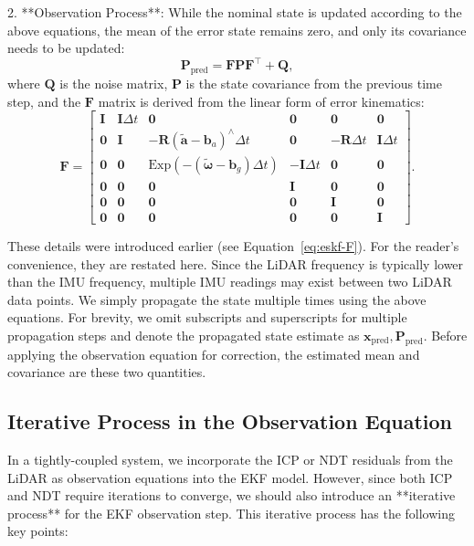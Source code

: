 2. **Observation Process**: While the nominal state is updated according to the above equations, the mean of the error state remains zero, and only its covariance needs to be updated:  
\begin{equation}\label{key}  
	\bm{P}_{\text{pred}} = \bm{F} \bm{P} \bm{F}^\top + \bm{Q},  
\end{equation}  
where $\bm{Q}$ is the noise matrix, $\bm{P}$ is the state covariance from the previous time step, and the $\bm{F}$ matrix is derived from the linear form of error kinematics:  
\begin{equation}  
	\bm{F} = \begin{bmatrix}  
		\bm{I} & \bm{I} \Delta t & \bm{0} & \bm{0} & \bm{0} & \bm{0} \\  
		\bm{0} & \bm{I} & - \bm{R}(\tilde{\bm{a}} - \bm{b}_a)^\wedge \Delta t & \bm{0} & -\bm{R} \Delta t & \bm{I} \Delta t \\  
		\bm{0} & \bm{0} & \mathrm{Exp}\left( -(\tilde{\boldsymbol{\omega}} - \bm{b}_g) \Delta t \right)   
		& -\bm{I} \Delta t & \bm{0} &\bm{0} \\  
		\bm{0} & \bm{0} & \bm{0} & \bm{I} & \bm{0} & \bm{0} \\  
		\bm{0} & \bm{0} & \bm{0} & \bm{0} & \bm{I} & \bm{0} \\  
		\bm{0} & \bm{0} & \bm{0} & \bm{0} & \bm{0} & \bm{I}  
	\end{bmatrix}.  
\end{equation}  

These details were introduced earlier (see Equation~\eqref{eq:eskf-F}). For the reader's convenience, they are restated here. Since the LiDAR frequency is typically lower than the IMU frequency, multiple IMU readings may exist between two LiDAR data points. We simply propagate the state multiple times using the above equations. For brevity, we omit subscripts and superscripts for multiple propagation steps and denote the propagated state estimate as $\bm{x}_{\mathrm{pred}}, \bm{P}_{\mathrm{pred}}$. Before applying the observation equation for correction, the estimated mean and covariance are these two quantities.

\subsection{Iterative Process in the Observation Equation}  

In a tightly-coupled system, we incorporate the ICP or NDT residuals from the LiDAR as observation equations into the EKF model. However, since both ICP and NDT require iterations to converge, we should also introduce an **iterative process** for the EKF observation step. This iterative process has the following key points:  

